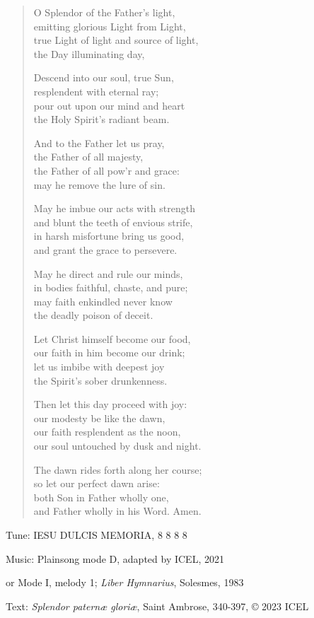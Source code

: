 \hymn

\begin{verse}
O Splendor of the Father’s light,\\
emitting glorious Light from Light,\\
true Light of light and source of light,\\
the Day illuminating day,

Descend into our soul, true Sun,\\
resplendent with eternal ray;\\
pour out upon our mind and heart\\
the Holy Spirit’s radiant beam.

And to the Father let us pray,\\
the Father of all majesty,\\
the Father of all pow’r and grace:\\
may he remove the lure of sin.

May he imbue our acts with strength\\
and blunt the teeth of envious strife,\\
in harsh misfortune bring us good,\\
and grant the grace to persevere.

May he direct and rule our minds,\\
in bodies faithful, chaste, and pure;\\
may faith enkindled never know\\
the deadly poison of deceit.

Let Christ himself become our food,\\
our faith in him become our drink;\\
let us imbibe with deepest joy\\
the Spirit’s sober drunkenness.

Then let this day proceed with joy:\\
our modesty be like the dawn,\\
our faith resplendent as the noon,\\
our soul untouched by dusk and night.

The dawn rides forth along her course;\\
so let our perfect dawn arise:\\
both Son in Father wholly one,\\
and Father wholly in his Word. Amen.
\end{verse}

\begin{hymnsource}
Tune: IESU DULCIS MEMORIA, 8 8 8 8

Music: Plainsong mode D, adapted by ICEL, 2021

or Mode I, melody 1; \emph{Liber Hymnarius}, Solesmes, 1983

Text: \emph{Splendor paternæ gloriæ}, Saint Ambrose, 340-397, © 2023 ICEL
\end{hymnsource}